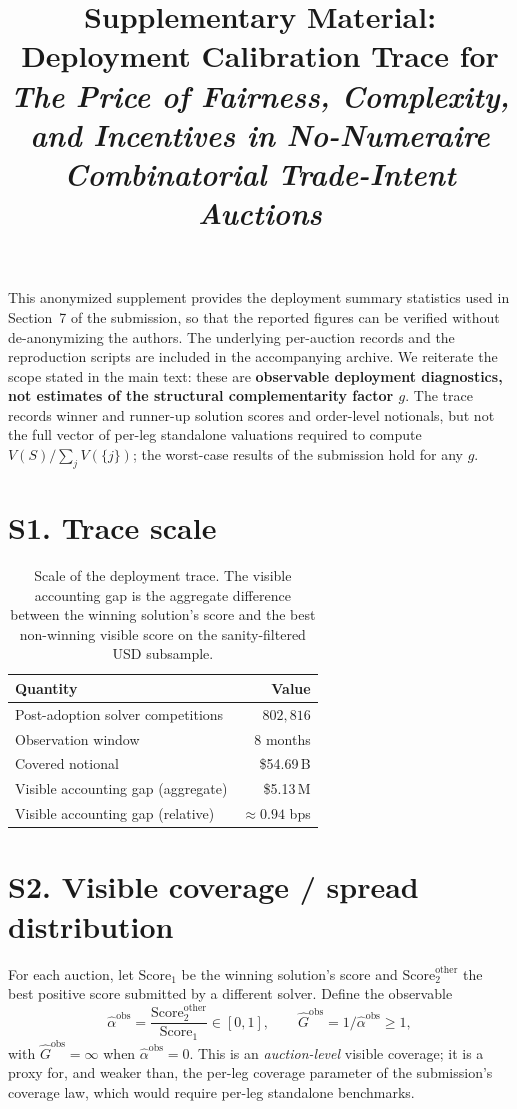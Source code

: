 \documentclass[11pt]{article}
\title{Supplementary Material:\\
Deployment Calibration Trace for\\
\emph{The Price of Fairness, Complexity, and Incentives in
No-Numeraire Combinatorial Trade-Intent Auctions}}
\author{}
\date{}
\begin{document}
\setlength{\emergencystretch}{3em}
\maketitle

\noindent
This anonymized supplement provides the deployment summary statistics used
in Section~7 of the submission, so that the reported figures can be
verified without de-anonymizing the authors. The underlying per-auction
records and the reproduction scripts are included in the accompanying
archive. We reiterate the scope stated in the main text: these are
\textbf{observable deployment diagnostics, not estimates of the structural
complementarity factor $g$}. The trace records winner and runner-up
solution scores and order-level notionals, but not the full vector of
per-leg standalone valuations required to compute $V(S)/\sum_j V(\{j\})$;
the worst-case results of the submission hold for any $g$.

\section*{S1. Trace scale}

\begin{table}[h]
\centering
\begin{tabular}{@{}lr@{}}
\toprule
Quantity & Value \\
\midrule
Post-adoption solver competitions & $802{,}816$ \\
Observation window & 8 months \\
Covered notional & \$54.69\,B \\
Visible accounting gap (aggregate) & \$5.13\,M \\
Visible accounting gap (relative) & $\approx 0.94$ bps \\
\bottomrule
\end{tabular}
\caption{Scale of the deployment trace. The visible accounting gap is the
aggregate difference between the winning solution's score and the best
non-winning visible score on the sanity-filtered USD subsample.}
\end{table}

\section*{S2. Visible coverage / spread distribution}

For each auction, let $\mathrm{Score}_1$ be the winning solution's score
and $\mathrm{Score}^{\mathrm{other}}_2$ the best positive score submitted
by a different solver. Define the observable
\[
\widehat\alpha^{\mathrm{obs}}
=\frac{\mathrm{Score}^{\mathrm{other}}_2}{\mathrm{Score}_1}\in[0,1],
\qquad
\widehat G^{\mathrm{obs}}=1/\widehat\alpha^{\mathrm{obs}}\ge1 ,
\]
with $\widehat G^{\mathrm{obs}}=\infty$ when
$\widehat\alpha^{\mathrm{obs}}=0$.
This is an \emph{auction-level} visible coverage; it is a proxy for, and
weaker than, the per-leg coverage parameter of the submission's
coverage law, which would require per-leg standalone benchmarks.
\end{document}
